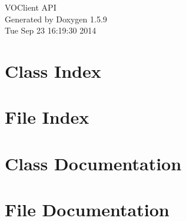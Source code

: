 \documentclass[a4paper]{book}
\begin{document}
\hypersetup{pageanchor=false}
\begin{titlepage}
\vspace*{7cm}
\begin{center}
{\Large VOClient API }\\
\vspace*{1cm}
{\large Generated by Doxygen 1.5.9}\\
\vspace*{0.5cm}
{\small Tue Sep 23 16:19:30 2014}\\
\end{center}
\end{titlepage}
\clearemptydoublepage
{}
\tableofcontents
\clearemptydoublepage
{}
\hypersetup{pageanchor=true}
\chapter{Class Index}

\chapter{File Index}

\chapter{Class Documentation}









\chapter{File Documentation}























\printindex
\end{document}
